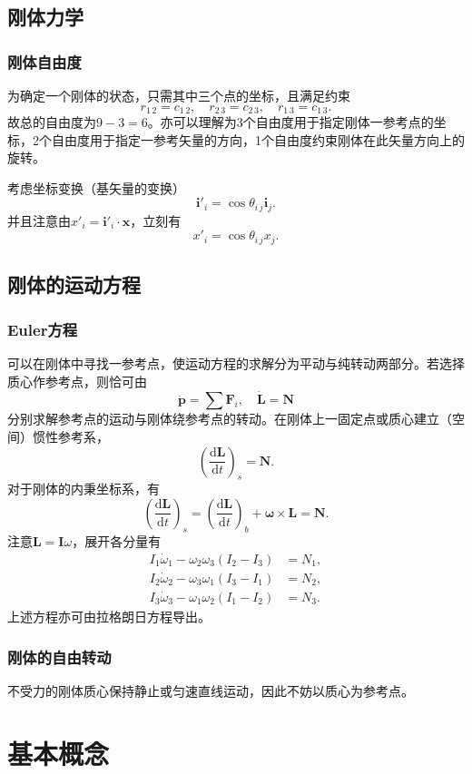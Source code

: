 \documentclass{ctexart}
\newcommand{\eddon}[2]{\frac{\mathrm{d} #1}{\mathrm{d} #2}}
\newcommand{\edton}[1]{\eddon{#1}{t}}
\newcommand{\pare}[1]{\left( #1 \right)}
\newcommand{\vF}{\boldsymbol{F}}
\newcommand{\vi}{\boldsymbol{i}}
\newcommand{\vI}{\boldsymbol{I}}
\newcommand{\vL}{\boldsymbol{L}}
\newcommand{\vN}{\boldsymbol{N}}
\newcommand{\vp}{\boldsymbol{p}}
\newcommand{\vx}{\boldsymbol{x}}
\newcommand{\vomega}{\boldsymbol{\omega}}
\newcommand{\pair}[2]{#1 \, #2}
\begin{document}
\subsection{刚体力学}
\subsubsection{刚体自由度}
为确定一个刚体的状态，只需其中三个点的坐标，且满足约束
\[ r_{\pair{1}{2}} = c_{\pair{1}{2}}, \quad r_{\pair{2}{3}} = c_{\pair{2}{3}}, \quad r_{\pair{1}{3}} = c_{\pair{1}{3}}. \]
故总的自由度为$9-3=6$。亦可以理解为3个自由度用于指定刚体一参考点的坐标，2个自由度用于指定一参考矢量的方向，1个自由度约束刚体在此矢量方向上的旋转。
\par
考虑坐标变换（基矢量的变换）
\[ \vi'_i = \cos \theta_{\pair{i}{j}}\vi_j. \]
并且注意由$x'_i = \vi'_i\cdot \vx$，立刻有
\[ x'_i = \cos \theta_{\pair{i}{j}} x_j. \]

\subsection{刚体的运动方程}
\subsubsection{Euler方程}
可以在刚体中寻找一参考点，使运动方程的求解分为平动与纯转动两部分。若选择质心作参考点，则恰可由
\[ \dot{\vp} = \sum \vF_i, \quad \dot{\vL} = \vN \]
分别求解参考点的运动与刚体绕参考点的转动。在刚体上一固定点或质心建立（空间）惯性参考系，
\[ \pare{\edton{\vL}}_s = \vN. \]
对于刚体的内秉坐标系，有
\[ \pare{\edton{\vL}}_s = \pare{\edton{\vL}}_b+\vomega\times\vL = \vN. \]
注意$\vL=\vI\omega$，展开各分量有
\begin{align*}
I_1\dot{\omega}_1-\omega_2\omega_3\pare{I_2-I_3}&=N_1,\\
I_2\dot{\omega}_2-\omega_3\omega_1\pare{I_3-I_1}&=N_2,\\
I_3\dot{\omega}_3-\omega_1\omega_2\pare{I_1-I_2}&=N_3.
\end{align*}
上述方程亦可由拉格朗日方程导出。
\subsubsection{刚体的自由转动}
不受力的刚体质心保持静止或匀速直线运动，因此不妨以质心为参考点。
\section{基本概念}
\end{document}
